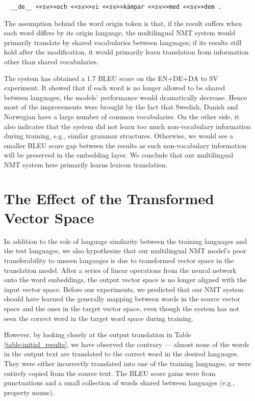 \documentclass[thesis,fonts=libertine]{cluu}
\begin{document}
\begin{verbatim}
  __de__ <<sv>>och <<sv>>vi <<sv>>kämpar <<sv>>med <<sv>>dem .
\end{verbatim}

The assumption behind the word origin token is that, if the result suffers when each word differs by its origin language, the multilingual NMT system would primarily translate by shared vocabularies between languages; if its results still hold after the modification, it would primarily learn translation from information other than shared vocabularies.

The system has obtained a 1.7 BLEU score on the EN+DE+DA to SV experiment. It showed that if each word is no longer allowed to be shared between languages, the models' performance would dramatically decrease. Hence most of the improvements were brought by the fact that Swedish, Danish and Norwegian have a large number of common vocabularies. On the other side, it also indicates that the system did not learn too much non-vocabulary information during training, e.g., similar grammar structures. Otherwise, we would see a smaller BLEU score gap between the results as such non-vocabulary information will be preserved in the embedding layer. We conclude that our multilingual NMT system here primarily learns lexicon translation.

\section{The Effect of the Transformed Vector Space}

In addition to the role of language similarity between the training languages and the test languages, we also hypothesize that our multilingual NMT model's poor transferability to unseen languages is due to transformed vector space in the translation model. After a series of linear operations from the neural network onto the word embeddings, the output vector space is no longer aligned with the input vector space. Before our experiments, we predicted that our NMT system should have learned the generally mapping between words in the source vector space and the ones in the target vector space, even though the system has not seen the correct word in the target word space during training.

However, by looking closely at the output translation in Table \ref{table:initial_results}, we have observed the contrary --- almost none of the words in the output text are translated to the correct word in the desired languages. They were either incorrectly translated into one of the training languages, or were entirely copied from the source text. The BLEU score gains were from punctuations and a small collection of words shared between languages (e.g., property nouns).
\end{document}
